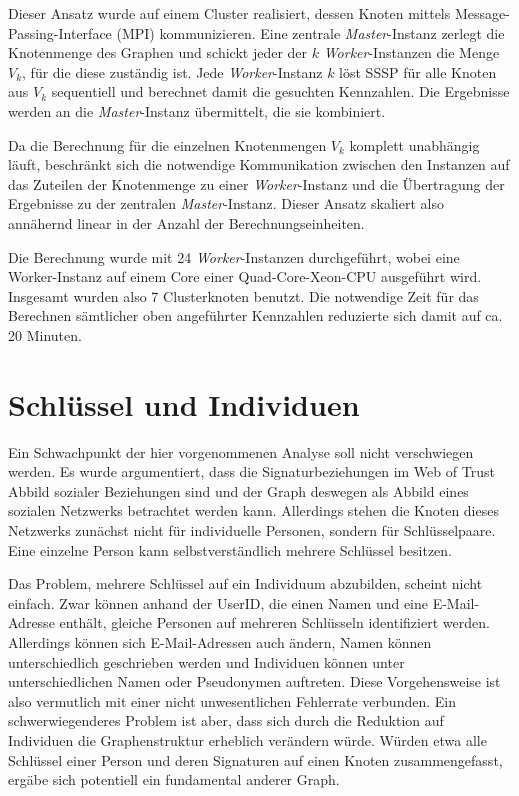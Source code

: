Dieser Ansatz wurde auf einem Cluster realisiert, dessen Knoten
mittels Message-Passing-Interface (MPI) kommunizieren. Eine zentrale
\emph{Master}-Instanz zerlegt die Knotenmenge des Graphen und schickt
jeder der $k$ \emph{Worker}-Instanzen die Menge $V_k$, für die diese
zuständig ist. Jede \emph{Worker}-Instanz $k$ löst SSSP für alle
Knoten aus $V_k$ sequentiell und berechnet damit die gesuchten
Kennzahlen. Die Ergebnisse werden an die \emph{Master}-Instanz
übermittelt, die sie kombiniert.

Da die Berechnung für die einzelnen Knotenmengen $V_k$ komplett
unabhängig läuft, beschränkt sich die notwendige Kommunikation
zwischen den Instanzen auf das Zuteilen der Knotenmenge zu einer
\emph{Worker}-Instanz und die Übertragung der Ergebnisse zu der
zentralen \emph{Master}-Instanz. Dieser Ansatz skaliert also
annähernd linear in der Anzahl der Berechnungseinheiten.

Die Berechnung wurde mit 24 \emph{Worker}-Instanzen durchgeführt,
wobei eine Worker-Instanz auf einem Core einer Quad-Core-Xeon-CPU
ausgeführt wird. Insgesamt wurden also 7 Clusterknoten benutzt. Die
notwendige Zeit für das Berechnen sämtlicher oben angeführter
Kennzahlen reduzierte sich damit auf ca. 20 Minuten.

\section{Schlüssel und Individuen}
\label{sec:schl-und-invid}

Ein Schwachpunkt der hier vorgenommenen Analyse soll nicht
verschwiegen werden. Es wurde argumentiert, dass die
Signaturbeziehungen im Web of Trust Abbild sozialer Beziehungen sind
und der Graph deswegen als Abbild eines sozialen Netzwerks betrachtet
werden kann. Allerdings stehen die Knoten dieses Netzwerks zunächst
nicht für individuelle Personen, sondern für
Schlüsselpaare. Eine einzelne Person kann selbstverständlich
mehrere Schlüssel besitzen.

Das Problem, mehrere Schlüssel auf ein Individuum abzubilden,
scheint nicht einfach. Zwar können anhand der UserID, die einen
Namen und eine E-Mail-Adresse enthält, gleiche Personen auf mehreren
Schlüsseln identifiziert werden. Allerdings können sich
E-Mail-Adressen auch ändern, Namen können unterschiedlich
geschrieben werden und Individuen können unter unterschiedlichen
Namen oder Pseudonymen auftreten. Diese Vorgehensweise ist also
vermutlich mit einer nicht unwesentlichen Fehlerrate verbunden. Ein
schwerwiegenderes Problem ist aber, dass sich durch die Reduktion auf
Individuen die Graphenstruktur erheblich verändern würde. Würden
etwa alle Schlüssel einer Person und deren Signaturen auf einen
Knoten zusammengefasst, ergäbe sich potentiell ein fundamental
anderer Graph.

